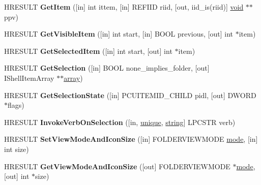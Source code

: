\begin{DoxyCompactItemize}
H\+R\+E\+S\+U\+LT {\bfseries Get\+Item} (\mbox{[}in\mbox{]} int ittem, \mbox{[}in\mbox{]} R\+E\+F\+I\+ID riid, \mbox{[}out, iid\+\_\+is(riid)\mbox{]} \hyperlink{interfacevoid}{void} $\ast$$\ast$ppv)
\item 
\mbox{\label{interface_i_folder_view2_a6422e78106dd422ae12e7384386d4928}} 
H\+R\+E\+S\+U\+LT {\bfseries Get\+Visible\+Item} (\mbox{[}in\mbox{]} int start, \mbox{[}in\mbox{]} B\+O\+OL previous, \mbox{[}out\mbox{]} int $\ast$item)
\item 
\mbox{\label{interface_i_folder_view2_ab6574df0052c74f94da60700d2421b79}} 
H\+R\+E\+S\+U\+LT {\bfseries Get\+Selected\+Item} (\mbox{[}in\mbox{]} int start, \mbox{[}out\mbox{]} int $\ast$item)
\item 
\mbox{\label{interface_i_folder_view2_abe92a38c511c28b5629155ea75f5155c}} 
H\+R\+E\+S\+U\+LT {\bfseries Get\+Selection} (\mbox{[}in\mbox{]} B\+O\+OL none\+\_\+implies\+\_\+folder, \mbox{[}out\mbox{]} I\+Shell\+Item\+Array $\ast$$\ast$\hyperlink{structarray}{array})
\item 
\mbox{\label{interface_i_folder_view2_ae5a329fa0d3843dad2746de7dbf0996e}} 
H\+R\+E\+S\+U\+LT {\bfseries Get\+Selection\+State} (\mbox{[}in\mbox{]} P\+C\+U\+I\+T\+E\+M\+I\+D\+\_\+\+C\+H\+I\+LD pidl, \mbox{[}out\mbox{]} D\+W\+O\+RD $\ast$flags)
\item 
\mbox{\label{interface_i_folder_view2_a45c6ac107e8070f73e03bb3ce813a9a9}} 
H\+R\+E\+S\+U\+LT {\bfseries Invoke\+Verb\+On\+Selection} (\mbox{[}in, \hyperlink{interfaceunique}{unique}, \hyperlink{structstring}{string}\mbox{]} L\+P\+C\+S\+TR verb)
\item 
\mbox{\label{interface_i_folder_view2_a9fa6813ee2eb25d07f25102c02fd46e0}} 
H\+R\+E\+S\+U\+LT {\bfseries Set\+View\+Mode\+And\+Icon\+Size} (\mbox{[}in\mbox{]} F\+O\+L\+D\+E\+R\+V\+I\+E\+W\+M\+O\+DE \hyperlink{interfacevoid}{mode}, \mbox{[}in\mbox{]} int size)
\item 
\mbox{\label{interface_i_folder_view2_a375639bce620ceb2040a468f9e791d23}} 
H\+R\+E\+S\+U\+LT {\bfseries Get\+View\+Mode\+And\+Icon\+Size} (\mbox{[}out\mbox{]} F\+O\+L\+D\+E\+R\+V\+I\+E\+W\+M\+O\+DE $\ast$\hyperlink{interfacevoid}{mode}, \mbox{[}out\mbox{]} int $\ast$size)

\end{DoxyCompactItemize}
